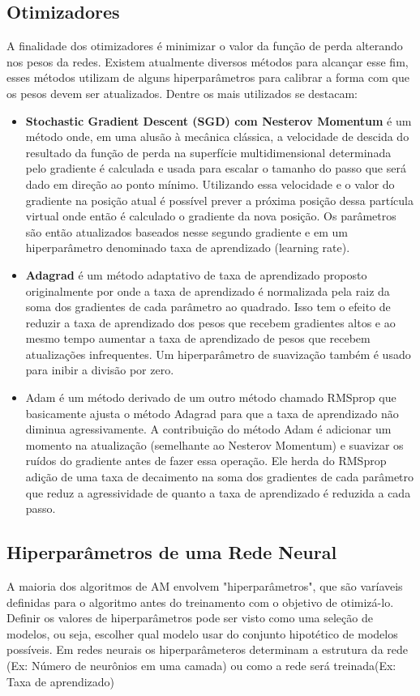\subsection{Otimizadores} \label{ssec:otimizadores}
A finalidade dos otimizadores é minimizar o valor da função de perda alterando nos pesos da redes. Existem atualmente diversos métodos para alcançar esse fim, esses métodos utilizam de alguns hiperparâmetros para calibrar a forma com que os pesos devem ser atualizados. Dentre os mais utilizados se destacam:
\begin{itemize}
	\item \textbf{ Stochastic Gradient Descent (SGD) com Nesterov Momentum} é um método onde, em uma alusão à mecânica clássica, a velocidade de descida do resultado da função de perda na superfície multidimensional determinada pelo gradiente é calculada e usada para escalar o tamanho do passo que será dado em direção ao ponto mínimo. Utilizando essa velocidade e o valor do gradiente na posição atual é possível prever a próxima posição dessa partícula virtual onde então é calculado o gradiente da nova posição. Os parâmetros são então atualizados baseados nesse segundo gradiente e em um hiperparâmetro denominado taxa de aprendizado (learning rate). \cite{bengio2012}
	\item \textbf{Adagrad} é um método adaptativo de taxa de aprendizado proposto originalmente por \cite{adagrad2011} onde a taxa de aprendizado é normalizada pela raiz da soma dos gradientes de cada parâmetro ao quadrado. Isso tem o efeito de reduzir a taxa de aprendizado dos pesos que recebem gradientes altos e ao mesmo tempo aumentar a taxa de aprendizado de pesos que recebem atualizações infrequentes. Um hiperparâmetro de suavização também é usado para inibir a divisão por zero.
	\item Adam é um método derivado de um outro método chamado RMSprop que basicamente ajusta o método Adagrad para que a taxa de aprendizado não diminua agressivamente. A contribuição do método Adam é adicionar um momento na atualização (semelhante ao Nesterov Momentum) e suavizar os ruídos do gradiente antes de fazer essa operação. Ele herda do RMSprop  adição de uma taxa de decaimento na soma dos gradientes de cada parâmetro que reduz a agressividade de quanto a taxa de aprendizado é reduzida a cada passo. \cite{adam2014}
\end{itemize}

\subsection{Hiperparâmetros de uma Rede Neural}
A maioria dos algoritmos de AM envolvem "hiperparâmetros", que são varíaveis definidas para o algoritmo antes do treinamento com o objetivo de otimizá-lo. Definir os valores de hiperparâmetros pode ser visto como uma seleção de modelos, ou seja, escolher qual modelo usar do conjunto hipotético de modelos possíveis. Em redes neurais os hiperparâmeteros determinam a estrutura da rede (Ex: Número de neurônios em uma camada) ou como a rede será treinada(Ex: Taxa de aprendizado)

